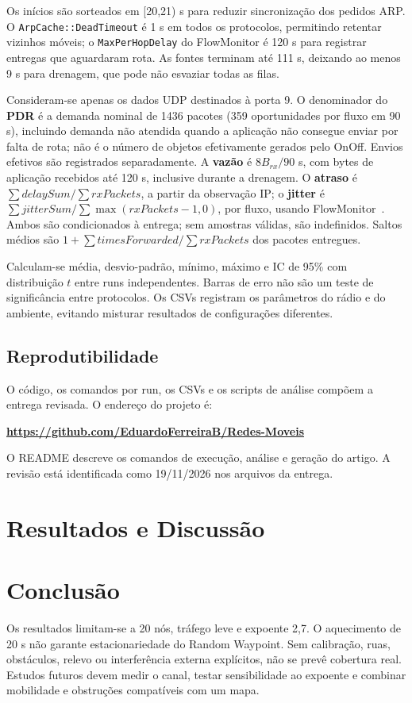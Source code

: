 \documentclass[12pt]{article}
\newcommand{\repo}{https://github.com/EduardoFerreiraB/Redes-Moveis}
\begin{document}
Os inícios são sorteados em [20,21) s para reduzir sincronização dos pedidos
ARP. O \texttt{ArpCache::DeadTimeout} é 1 s em todos os protocolos, permitindo
retentar vizinhos móveis; o \texttt{MaxPerHopDelay} do FlowMonitor é 120 s
para registrar entregas que aguardaram rota. As fontes terminam até 111 s,
deixando ao menos 9 s para drenagem, que pode não esvaziar todas as filas.

Consideram-se apenas os dados UDP destinados à porta 9. O denominador do
\textbf{PDR} é a demanda nominal de 1436 pacotes (359 oportunidades por
fluxo em 90 s), incluindo demanda não atendida quando a aplicação não
consegue enviar por falta de rota; não é o número de objetos efetivamente
gerados pelo OnOff. Envios efetivos são registrados separadamente. A
\textbf{vazão} é $8B_{rx}/90$ s, com bytes de aplicação recebidos até 120 s,
inclusive durante a drenagem. O \textbf{atraso} é
$\sum delaySum/\sum rxPackets$, a partir da observação IP; o
\textbf{jitter} é $\sum jitterSum/\sum\max(rxPackets-1,0)$, por fluxo,
usando FlowMonitor~\cite{ns3flow}. Ambos são condicionados à entrega;
sem amostras válidas, são indefinidos. Saltos médios são
$1+\sum timesForwarded/\sum rxPackets$ dos pacotes entregues.

Calculam-se média, desvio-padrão, mínimo, máximo e IC de 95\% com distribuição
$t$ entre runs independentes. Barras de erro não são um teste de significância
entre protocolos. Os CSVs registram os parâmetros do rádio e do ambiente,
evitando misturar resultados de configurações diferentes.

\subsection{Reprodutibilidade}
O código, os comandos por run, os CSVs e os scripts de análise compõem a
entrega revisada. O endereço do projeto é:
\begin{center}
\textbf{\url{\repo}}
\end{center}
O README descreve os comandos de execução, análise e geração do artigo.
A revisão está identificada como 19/11/2026 nos arquivos da entrega.

\section{Resultados e Discussão}


\section{Conclusão}
\ResultConclusao{}
Os resultados limitam-se a 20 nós, tráfego leve e expoente 2,7. O aquecimento
de 20 s não garante estacionariedade do Random Waypoint. Sem calibração,
ruas, obstáculos, relevo ou interferência externa explícitos, não se prevê
cobertura real. Estudos futuros devem medir o canal, testar sensibilidade
ao expoente e combinar mobilidade e obstruções compatíveis com um mapa.



\end{document}
